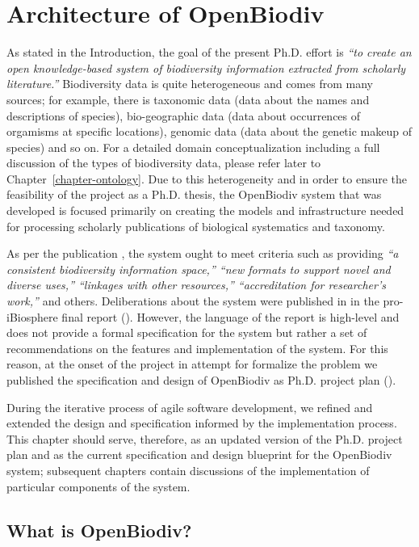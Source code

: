 \chapter{Architecture of OpenBiodiv}
\label{chapter-openbiodiv}

As stated in the Introduction, the goal of the present Ph.D. effort is \emph{``to create an open knowledge-based system of biodiversity information extracted from scholarly literature.''} Biodiversity data is quite heterogeneous and comes from many sources; for example, there is taxonomic data (data about the names and descriptions of species), bio-geographic data (data about occurrences of orgamisms at specific locations), genomic data (data about the genetic makeup of species) and so on. For a detailed domain conceptualization including a full discussion of the types of biodiversity data, please refer later to Chapter~\ref{chapter-ontology}. Due to this heterogeneity and in order to ensure the feasibility of the project as a Ph.D. thesis, the OpenBiodiv system that was developed is focused primarily on creating the models and infrastructure needed for processing scholarly publications of biological systematics and taxonomy. 

As per the publication \cite{noauthor_open_2014}, the system ought to meet criteria such as providing \emph{``a consistent biodiversity information space,'' ``new formats to support novel and diverse uses,'' ``linkages with other resources,'' ``accreditation for researcher's work,''} and others. Deliberations about the system were published in in the pro-iBiosphere final report (\cite{noauthor_pro-ibiosphere_2014}). However, the language of the report is high-level and does not provide a formal specification for the system but rather a set of recommendations on the features and implementation of the system. For this reason, at the onset of the project in attempt for formalize the problem we published the specification and design of OpenBiodiv as Ph.D. project plan (\cite{senderov_open_2016}).

During the iterative process of agile software development, we refined and extended the design and specification informed by the implementation process. This chapter should serve, therefore, as an updated version of the Ph.D. project plan and as the current specification and design blueprint for the OpenBiodiv system; subsequent chapters contain discussions of the implementation of particular components of the system.

\section{What is OpenBiodiv?}

